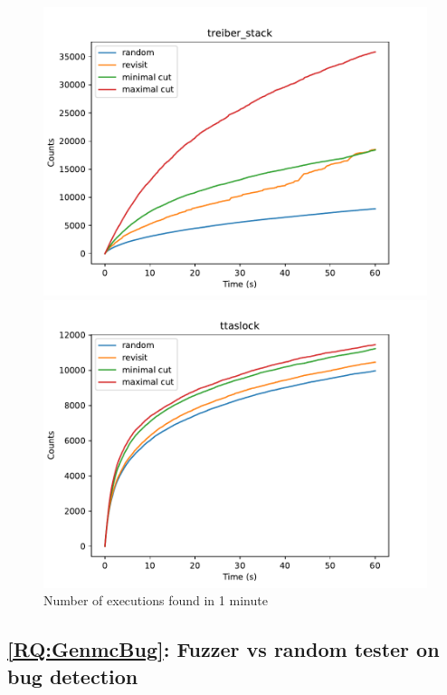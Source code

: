 \begin{figure}[h!]
	\begin{minipage}{0.45\textwidth}
		\centering
		\includegraphics[width=\textwidth]{figure/genmc-time/treiber_stack.pdf}
	\end{minipage}
	\hfill
	\begin{minipage}{0.45\textwidth}
		\centering
		\includegraphics[width=\textwidth]{figure/genmc-time/ttaslock.pdf}
	\end{minipage}
	\caption{Number of executions found in 1 minute}
	\label{genmc:fixed-time}
\end{figure}

\subsection{\ref*{RQ:GenmcBug}: Fuzzer vs random tester on bug detection}

